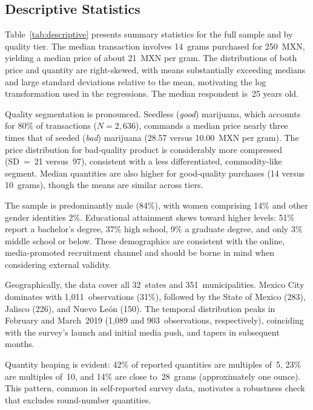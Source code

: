 \subsection{Descriptive Statistics}

Table~\ref{tab:descriptive} presents summary statistics for the full sample and by quality tier.  The median transaction involves 14~grams purchased for 250~MXN, yielding a median price of about 21~MXN per gram.  The distributions of both price and quantity are right-skewed, with means substantially exceeding medians and large standard deviations relative to the mean, motivating the log transformation used in the regressions.  The median respondent is~25 years old.



Quality segmentation is pronounced.  Seedless (\emph{good}) marijuana, which accounts for 80\% of transactions ($N = 2{,}636$), commands a median price nearly three times that of seeded (\emph{bad}) marijuana (28.57 versus 10.00~MXN per gram).  The price distribution for bad-quality product is considerably more compressed (SD~=~21 versus~97), consistent with a less differentiated, commodity-like segment.  Median quantities are also higher for good-quality purchases (14 versus 10~grams), though the means are similar across tiers.

The sample is predominantly male (84\%), with women comprising 14\% and other gender identities 2\%.  Educational attainment skews toward higher levels: 51\% report a bachelor's degree, 37\% high school, 9\% a graduate degree, and only 3\% middle school or below.  These demographics are consistent with the online, media-promoted recruitment channel and should be borne in mind when considering external validity.

Geographically, the data cover all 32~states and 351~municipalities.  Mexico City dominates with 1{,}011~observations (31\%), followed by the State of Mexico (283), Jalisco (226), and Nuevo Le\'{o}n (150).  The temporal distribution peaks in February and March~2019 (1{,}089 and 903~observations, respectively), coinciding with the survey's launch and initial media push, and tapers in subsequent months.

Quantity heaping is evident: 42\% of reported quantities are multiples of~5, 23\% are multiples of~10, and 14\% are close to~28~grams (approximately one ounce).  This pattern, common in self-reported survey data, motivates a robustness check that excludes round-number quantities.


